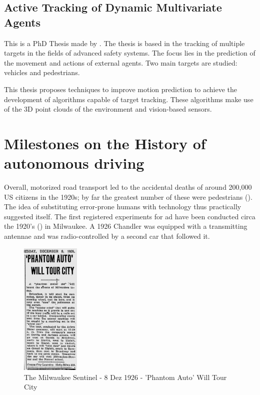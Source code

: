 \subsection{Active Tracking of Dynamic Multivariate Agents} 

This is a PhD Thesis made by \cite{SoaresDeAlmeida2016a}. The thesis is based in the tracking of multiple targets in the fields of advanced safety systems. The focus lies in the prediction of the movement and actions of external agents. Two main targets are studied: vehicles and pedestrians. 

This thesis proposes techniques to improve motion prediction to achieve the development of algorithms capable of target tracking. These algorithms make use of the 3D point clouds of the environment and vision-based sensors. 

\section{Milestones on the History of autonomous driving}

Overall, motorized road transport led to the accidental deaths of around 200,000 US citizens in the 1920s; by far the greatest number of these were pedestrians (\cite{Kroger2016}). The idea of substituting error-prone humans with technology thus practically suggested itself. The first registered experiments for \gls{ad} have been conducted circa the 1920's (\cite{TheMilwaukeeSentinel}) in Milwaukee. A 1926 Chandler was equipped with a transmitting antennae and was radio-controlled by a second car that followed it.

\begin{figure}[htp]
	
	\centering
	\includegraphics[width=0.25\textwidth]{capstate/imgs/jornal.png}
	
	\caption{The Milwaukee Sentinel - 8 Dez 1926 - 'Phantom Auto' Will Tour City}
	\label{fig:waymo}
	
\end{figure}

